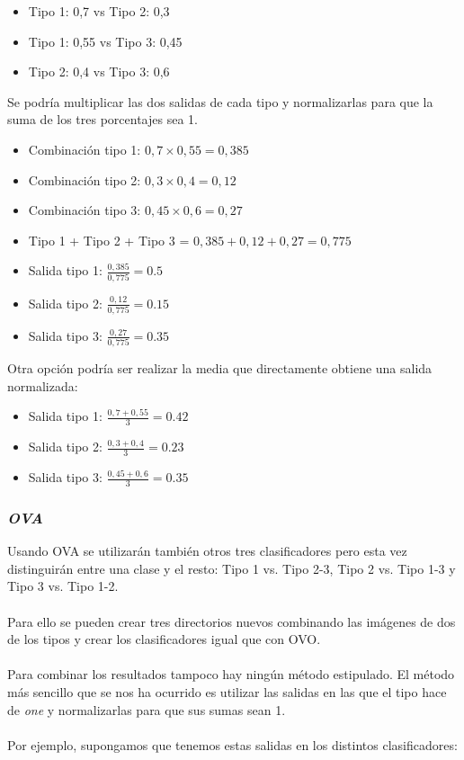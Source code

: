 \begin{itemize}
	\item Tipo 1: 0,7 vs Tipo 2: 0,3
	\item Tipo 1: 0,55 vs Tipo 3: 0,45
	\item Tipo 2: 0,4 vs Tipo 3: 0,6
\end{itemize}

Se podría multiplicar las dos salidas de cada tipo y normalizarlas para que la suma de los tres porcentajes sea 1.

\begin{itemize}
	\item Combinación tipo 1: $ 0,7 \times 0,55 = 0,385 $
	\item Combinación tipo 2: $ 0,3 \times 0,4 = 0,12 $
	\item Combinación tipo 3: $ 0,45 \times 0,6 = 0,27 $
	\item Tipo 1 + Tipo 2 + Tipo 3 = $ 0,385 + 0,12 + 0,27 = 0,775 $
	\item Salida tipo 1: $ \frac{0,385}{0,775} = 0.5 $
	\item Salida tipo 2: $ \frac{0,12}{0,775} = 0.15 $
	\item Salida tipo 3: $ \frac{0,27}{0,775} = 0.35 $
\end{itemize}

Otra opción podría ser realizar la media que directamente obtiene una salida normalizada:

\begin{itemize}
	\item Salida tipo 1: $ \frac{0,7 + 0,55}{3} = 0.42 $
	\item Salida tipo 2: $ \frac{0,3 + 0,4}{3} = 0.23 $
	\item Salida tipo 3: $ \frac{0,45 + 0,6}{3} = 0.35 $
\end{itemize}

\subsubsection{\textit{OVA}}

Usando OVA se utilizarán también otros tres clasificadores pero esta vez distinguirán entre una clase y el resto: Tipo 1 vs. Tipo 2-3, Tipo 2 vs. Tipo 1-3 y Tipo 3 vs. Tipo 1-2.
\\ \\
Para ello se pueden crear tres directorios nuevos combinando las imágenes de dos de los tipos y crear los clasificadores igual que con OVO. 
\\ \\
Para combinar los resultados tampoco hay ningún método estipulado. El método más sencillo que se nos ha ocurrido es utilizar las salidas en las que el tipo hace de \textit{one} y normalizarlas para que sus sumas sean 1.
\\ \\
Por ejemplo, supongamos que tenemos estas salidas en los distintos clasificadores:

